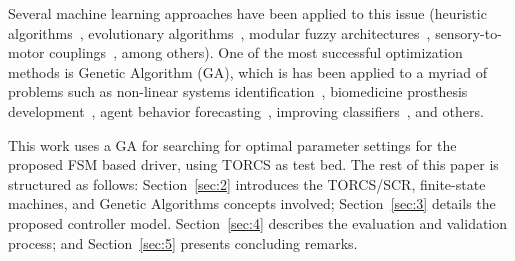 Several machine learning approaches have been applied to this issue (heuristic algorithms~\cite{MrRacer}, evolutionary algorithms~\cite{Nallaperuma:2014}, modular fuzzy architectures~\cite{AUTOPIA}, sensory-to-motor couplings~\cite{COBOSTAR}, among others). One of the most successful optimization methods is Genetic Algorithm (GA), which is has been applied to a myriad of problems such as non-linear systems identification~\cite{GACTRL}, biomedicine prosthesis development~\cite{GABIO}, agent behavior forecasting~\cite{GAECO}, improving classifiers~\cite{pedrycz_genetic_2005}, and others.

This work uses a GA for searching for optimal parameter settings for the proposed FSM based driver, using TORCS as test bed. The rest of this paper is structured as follows: Section~\ref{sec:2} introduces the TORCS/SCR, finite-state machines, and Genetic Algorithms concepts involved; Section~\ref{sec:3} details the proposed controller model. Section~\ref{sec:4} describes the evaluation and validation process; and Section~\ref{sec:5} presents concluding remarks.